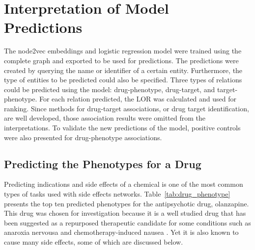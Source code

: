 \section{Interpretation of Model Predictions}

The node2vec embeddings and logistic regression model were trained using the complete graph and exported to be used for predictions.
The predictions were created by querying the name or identifier of a certain entity.
Furthermore, the type of entities to be predicted could also be specified.
Three types of relations could be predicted using the model: drug-phenotype, drug-target, and target-phenotype.
For each relation predicted, the LOR was calculated and used for ranking.
Since methods for drug-target associations, or drug target identification, are well developed, those association results were omitted from the interpretations.
To validate the new predictions of the model, positive controls were also presented for drug-phenotype associations.

\subsection{Predicting the Phenotypes for a Drug}

Predicting indications and side effects of a chemical is one of the most common types of tasks used with side effects networks.
Table~\ref{tab:drug_phenotype} presents the top ten predicted phenotypes for the antipsychotic drug, olanzapine. 
This drug was chosen for investigation because it is a well studied drug that has been suggested as a repurposed therapeutic candidate for some conditions such as anaroxia nervousa \cite{himmerich_olanzapine_2017} and chemotherapy-induced nausea \cite{flank_olanzapine_2018}. 
Yet it is also known to cause many side effects, some of which are discussed below.

